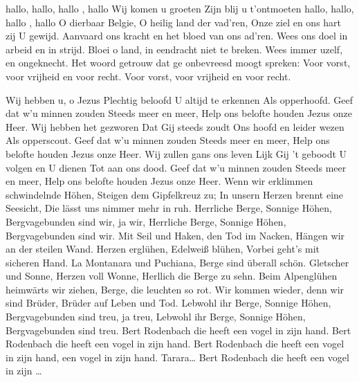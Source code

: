 \documentclass{article}
\begin{document}
\begin{songs}{}
\begin{intersong}
\end{intersong}
\beginverse*
hallo, hallo, hallo , hallo
Wij komen u groeten
Zijn blij u t'ontmoeten
hallo, hallo, hallo , hallo
\endverse
\endsong
{}
\beginverse*
O dierbaar Belgie, O heilig land der vad'ren, Onze ziel en ons hart zij U gewijd.
Aanvaard ons kracht en het bloed van ons ad'ren. Wees ons doel in arbeid en in strijd.
Bloei o land, in eendracht niet te breken. Wees immer uzelf, en ongeknecht.
Het woord getrouw dat ge onbevreesd moogt spreken: Voor vorst, voor vrijheid en voor recht.
Voor vorst, voor vrijheid en voor recht.

\endverse
\endsong
{}
\beginverse
Wij hebben u, o Jezus
Plechtig beloofd
U altijd te erkennen
Als opperhoofd.
\endverse
\beginchorus
Geef dat w'u minnen zouden
Steeds meer en meer,
Help ons belofte houden
Jezus onze Heer.
\endchorus
\beginverse
Wij hebben het gezworen
Dat Gij steeds zoudt
Ons hoofd en leider wezen
Als opperscout.
\endverse
\beginverse
Geef dat w'u minnen zouden
Steeds meer en meer,
Help ons belofte houden
Jezus onze Heer.
\endverse
\beginverse
Wij zullen gans ons leven
Lijk Gij 't geboodt
U volgen en U dienen
Tot aan ons dood.
\endverse
\beginverse
Geef dat w'u minnen zouden
Steeds meer en meer,
Help ons belofte houden
Jezus onze Heer.
\endverse
\endsong
{}
\beginverse
Wenn wir erklimmen schwindelnde Höhen,
Steigen dem Gipfelkreuz zu;
In unsern Herzen brennt eine Seesicht,
Die lässt uns nimmer mehr in ruh. 
\endverse
\beginchorus
Herrliche Berge, Sonnige Höhen,
Bergvagebunden sind wir, ja wir,
Herrliche Berge, Sonnige Höhen,
Bergvagebunden sind wir.
\endchorus
\beginverse
Mit Seil und Haken, den Tod im Nacken,
Hängen wir an der steilen Wand. 
Herzen erglühen, Edelweiß blühen,
Vorbei geht’s mit sicheren Hand.
\endverse
\beginverse
La Montanara und Puchiana,
Berge sind überall schön.
Gletscher und Sonne, Herzen voll Wonne,
Herllich die Berge zu sehn.
\endverse
\beginverse
Beim Alpenglühen heimwärts wir ziehen,
Berge, die leuchten so rot. 
Wir kommen wieder, denn wir sind Brüder,
Brüder auf Leben und Tod.
\endverse
\beginchorus
Lebwohl ihr Berge,
Sonnige Höhen,
Bergvagebunden sind treu, ja treu,
Lebwohl ihr Berge, Sonnige Höhen,
Bergvagebunden sind treu. 
\endchorus
\endsong
{}
\beginverse*
Bert Rodenbach die heeft een vogel in zijn hand. 
Bert Rodenbach die heeft een vogel in zijn hand.
Bert Rodenbach die heeft een vogel in zijn hand, een vogel in zijn hand. Tarara…
\endverse
\beginverse
Bert Rodenbach die heeft een vogel in zijn …

\end{songs}
\end{document}
